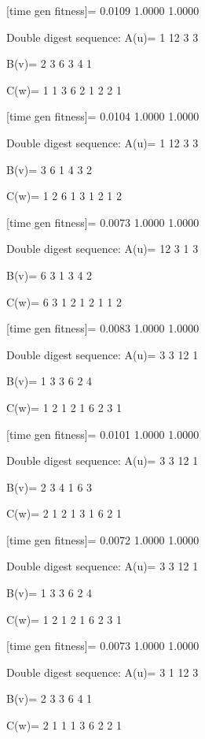 [time gen fitness]=
    0.0109    1.0000    1.0000

Double digest sequence:
A(u)=
     1    12     3     3

B(v)=
     2     3     6     3     4     1

C(w)=
     1     1     3     6     2     1     2     2     1

[time gen fitness]=
    0.0104    1.0000    1.0000

Double digest sequence:
A(u)=
     1    12     3     3

B(v)=
     3     6     1     4     3     2

C(w)=
     1     2     6     1     3     1     2     1     2

[time gen fitness]=
    0.0073    1.0000    1.0000

Double digest sequence:
A(u)=
    12     3     1     3

B(v)=
     6     3     1     3     4     2

C(w)=
     6     3     1     2     1     2     1     1     2

[time gen fitness]=
    0.0083    1.0000    1.0000

Double digest sequence:
A(u)=
     3     3    12     1

B(v)=
     1     3     3     6     2     4

C(w)=
     1     2     1     2     1     6     2     3     1

[time gen fitness]=
    0.0101    1.0000    1.0000

Double digest sequence:
A(u)=
     3     3    12     1

B(v)=
     2     3     4     1     6     3

C(w)=
     2     1     2     1     3     1     6     2     1

[time gen fitness]=
    0.0072    1.0000    1.0000

Double digest sequence:
A(u)=
     3     3    12     1

B(v)=
     1     3     3     6     2     4

C(w)=
     1     2     1     2     1     6     2     3     1

[time gen fitness]=
    0.0073    1.0000    1.0000

Double digest sequence:
A(u)=
     3     1    12     3

B(v)=
     2     3     3     6     4     1

C(w)=
     2     1     1     1     3     6     2     2     1

